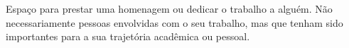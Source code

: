 
\begin{dedicatoria}
  \vspace*{\fill}
  \noindent
  \begin{flushright}
    \begin{minipage}{.5\textwidth}
      \begin{OnehalfSpacing}
        Espaço para prestar uma homenagem ou dedicar o trabalho a alguém. Não necessariamente pessoas 
        envolvidas com o seu trabalho, mas que tenham sido importantes para a sua trajetória acadêmica 
        ou pessoal.
      \end{OnehalfSpacing}
    \end{minipage}
  \end{flushright}
\end{dedicatoria}

